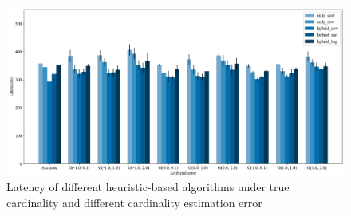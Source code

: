    \begin{figure}[htb]
        \includegraphics[width=\linewidth]{./pic/Figure9.png}
        \centering
        \caption{Latency of different heuristic-based algorithms under true cardinality and different cardinality estimation error}
        \label{F9}
        \Description{}
    \end{figure}\par

